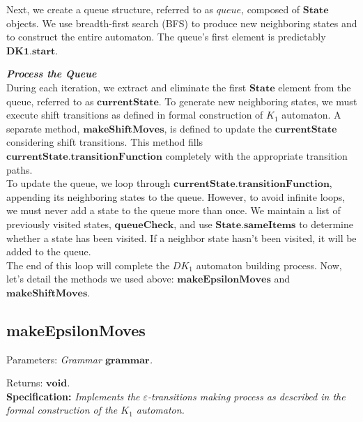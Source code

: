 Next, we create a queue structure, referred to as \(queue\), composed of \(\boldsymbol{State}\) objects. We use breadth-first search (BFS) to produce new neighboring states and to construct the entire automaton. The queue's first element is predictably \(\boldsymbol{DK1.start}\).\\

\vspace{15pt}

\textbf{\textit{Process the Queue}}\\

During each iteration, we extract and eliminate the first \(\boldsymbol{State}\) element from the queue, referred to as \(\boldsymbol{currentState}\). To generate new neighboring states, we must execute shift transitions as defined in formal construction of \({K_{1}}\) automaton. A separate method, \(\boldsymbol{makeShiftMoves}\), is defined to update the \(\boldsymbol{currentState}\) considering shift transitions. This method fills \(\boldsymbol{currentState.transitionFunction}\) completely with the appropriate transition paths.\\

To update the queue, we loop through \(\boldsymbol{currentState.transitionFunction}\), appending its neighboring states to the queue. However, to avoid infinite loops, we must never add a state to the queue more than once. We maintain a list of previously visited states, \(\boldsymbol{queueCheck}\), and use \(\boldsymbol{State.sameItems}\) to determine whether a state has been visited. If a neighbor state hasn't been visited, it will be added to the queue.\\

The end of this loop will complete the \(DK_{1}\) automaton building process. Now, let's detail the methods we used above: \(\boldsymbol{makeEpsilonMoves}\) and \(\boldsymbol{makeShiftMoves}\).

\vspace{20pt}

\subsection{makeEpsilonMoves}

Parameters: \textit{Grammar \(\boldsymbol{grammar}\).}

Returns: \textit{\(\boldsymbol{void}\).}\\

\textbf{Specification:} \textit{Implements the \(\varepsilon\)-transitions making process as described in the formal construction of the \({K_{1}}\) automaton.}\\

